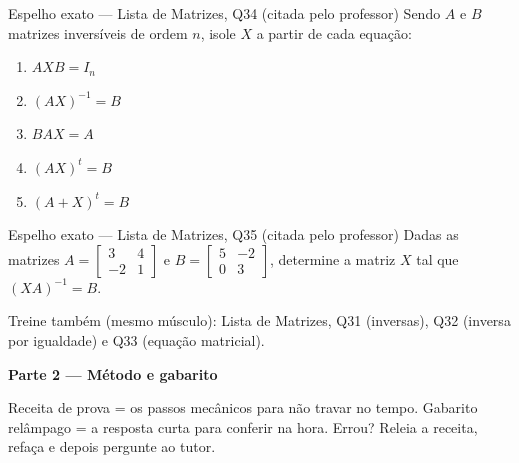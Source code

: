 \documentclass[11pt]{article}
\newcommand{\meta}[1]{{\small\color{inkgray}#1}}
\begin{document}
\begin{espelhobox}{Espelho exato — Lista de Matrizes, Q34 (citada pelo professor)}
Sendo $A$ e $B$ matrizes inversíveis de ordem $n$, isole $X$ a partir de cada equação:
\begin{enumerate}[label=\alph*), leftmargin=2em]
  \item $AXB = I_{n}$
  \item $(AX)^{-1} = B$
  \item $BAX = A$
  \item $(AX)^{t} = B$
  \item $(A+X)^{t} = B$
\end{enumerate}
\end{espelhobox}

\begin{espelhobox}{Espelho exato — Lista de Matrizes, Q35 (citada pelo professor)}
Dadas as matrizes $A=\begin{bmatrix} 3 & 4 \\ -2 & 1 \end{bmatrix}$ e $B=\begin{bmatrix} 5 & -2 \\ 0 & 3 \end{bmatrix}$,
determine a matriz $X$ tal que $(XA)^{-1}=B$.
\end{espelhobox}

\meta{Treine também (mesmo músculo): Lista de Matrizes, Q31 (inversas), Q32 (inversa por igualdade) e Q33 (equação matricial).}

\newpage
{\large\bfseries\color{tealdeep}Parte 2 — Método e gabarito}

\vspace{2pt}
\meta{Receita de prova = os passos mecânicos para não travar no tempo. Gabarito relâmpago = a resposta curta para conferir na hora. Errou? Releia a receita, refaça e depois pergunte ao tutor.}
\end{document}
